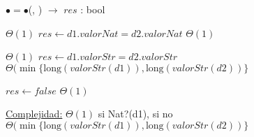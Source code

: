 


		



\begin{algorithm}[H]{\textbf{$\bullet = \bullet$}(, ) $\to$ $res$ : bool}
    	\begin{algorithmic}[1]

			  \Comment $\Theta(1)$
			 	\State $res \gets d1.valorNat = d2.valorNat$ \Comment $\Theta(1)$

			 \Comment $\Theta(1)$
				\State $res \gets d1.valorStr = d2.valorStr$ \Comment $\Theta(\min\{\text{long}(valorStr(d1)), \text{long}(valorStr(d2))\}$

			\Else
				\State $res \gets false$ \Comment $\Theta(1)$

			\EndIf

			\medskip
			\Statex \underline{Complejidad:} $\Theta(1)$ si Nat?(d1), si no $\Theta(\min\{\text{long}(valorStr(d1)), \text{long}(valorStr(d2))\}$
    	\end{algorithmic}
\end{algorithm}
